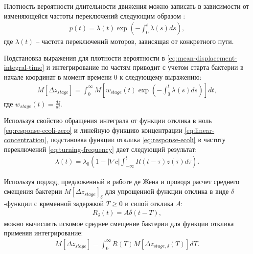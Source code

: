 Плотность вероятности длительности движения можно записать в зависимости от изменяющейся частоты переключений следующим образом \cite{pasupathy_generating_2011}:
\begin{equation}
    \begin{aligned}
        p(t)=\lambda(t) \exp \left ( -\int_0^t \lambda(s) ds \right ),
    \label{eq:duration-prob-exp-integral}
    \end{aligned}
\end{equation}
где $\lambda(t)$ -- частота переключений моторов, зависящая от конкретного пути.

Подстановка выражения для плотности вероятности в \cref{eq:mean-displacement-integral-time} и интегрирование по частям приводит с учетом старта бактерии в начале координат в момент времени 0 к следующему выражению:
\begin{equation}
    \begin{aligned}
        M[\Delta z_{stage}]=\int_0^{\infty} M \left [w_{stage}(t) \exp \left ( -\int_0^t \lambda(s) ds \right ) \right ]dt,
    \label{eq:mean-displacement-on-frequency}
    \end{aligned}
\end{equation}
где $w_{stage}(t)=\frac{dz}{dt}$.

Используя свойство обращения интеграла от функции отклика в ноль \cref{eq:response-ecoli-zero} и линейную функцию концентрации \cref{eq:linear-concentration}, подстановка функции отклика \cref{eq:response-ecoli} в частоту переключений \cref{eq:turning-frequency} дает следующий результат:
\begin{equation}
    \begin{aligned}
        \lambda(t)=\lambda_0 \left ( 1 - |\nabla c| \int_{-\infty}^t R(t-\tau)z(\tau)d\tau \right ).
    \label{eq:frequency-on-response}
    \end{aligned}
\end{equation}

Используя подход, предложенный в работе де Жена \cite{de_gennes_chemotaxis_2004} и проводя расчет среднего смещения бактерии  $M[\Delta z_{stage}]_{\delta}$ для упрощенной функции отклика в виде $\delta$-функции с временной задержкой $T \geq 0$ и силой отклика $A$:
\begin{equation}
    \begin{aligned}
        R_\delta(t) = A \delta(t - T),
    \label{eq:response-delta}
    \end{aligned}
\end{equation}
можно вычислить искомое среднее смещение бактерии для функции отклика применяя интегрирование:
\begin{equation}
    \begin{aligned}
        M[\Delta z_{stage}]=\int_0^{\infty} R(T) M[\Delta z_{stage,\delta}(T)] dT.
    \label{eq:mean-displacement-on-md-delta}
    \end{aligned}
\end{equation}

